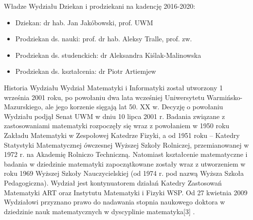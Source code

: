 \documentclass[a4paper,12pt]{article}
\begin{document}
Władze Wydziału
Dziekan i prodziekani na kadencję 2016-2020:
\begin{itemize}
\item Dziekan: dr hab. Jan Jakóbowski, prof. UWM
\item Prodziekan ds. nauki: prof. dr hab. Aleksy Tralle, prof. zw.
\item Prodziekan ds. studenckich: dr Aleksandra Kiślak-Malinowska
\item Prodziekan ds. kształcenia: dr Piotr Artiemjew
\end{itemize}

Historia Wydziału
Wydział Matematyki i Informatyki został utworzony 1 września 2001 roku, po powołaniu dwa lata wcześniej
Uniwersytetu Warmińsko-Mazurskiego, ale jego korzenie sięgają lat 50. XX w. Decyzję o powołaniu Wydziału
podjął Senat UWM w dniu 10 lipca 2001 r. Badania związane z zastosowaniami matematyki rozpoczęły się
wraz z powołaniem w 1950 roku Zakładu Matematyki w Zespołowej Katedrze Fizyki, a od 1951 roku –
Katedry Statystyki Matematycznej ówczesnej Wyższej Szkoły Rolniczej, przemianowanej w 1972 r. na
Akademię Rolniczo Techniczną. Natomiast kształcenie matematyczne i badania w dziedzinie matematyki
zapoczątkowane zostały wraz z utworzeniem w roku 1969 Wyższej Szkoły Nauczycielskiej (od 1974 r. pod
nazwą Wyższa Szkoła Pedagogiczna). Wydział jest kontynuatorem działań Katedry Zastosowań Matematyki
ART oraz Instytutu Matematyki i Fizyki WSP.
Od 27 kwietnia 2009 Wydziałowi przyznano prawo do nadawania stopnia naukowego doktora w dziedzinie
nauk matematycznych w dyscyplinie matematyka[3]
.
\end{document}
